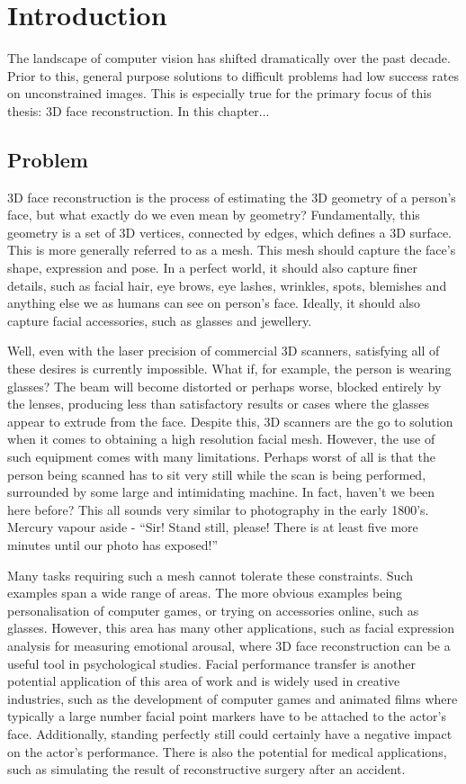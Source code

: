 \graphicspath{{chapter_introduction/}}
\chapter{Introduction}

The landscape of computer vision has shifted dramatically over the
past decade. Prior to this, general purpose solutions to difficult
problems had low success rates on unconstrained images. This is
especially true for the primary focus of this thesis: 3D face
reconstruction. In this chapter...

\section{Problem}

3D face reconstruction is the process of estimating the 3D geometry of
a person's face, but what exactly do we even mean by geometry?
Fundamentally, this geometry is a set of 3D vertices, connected by
edges, which defines a 3D surface. This is more generally referred to
as a mesh. This mesh should capture the face's shape, expression and
pose. In a perfect world, it should also capture finer details, such
as facial hair, eye brows, eye lashes, wrinkles, spots, blemishes and
anything else we as humans can see on person's face. Ideally, it
should also capture facial accessories, such as glasses and jewellery.

Well, even with the laser precision of commercial 3D scanners,
satisfying all of these desires is currently impossible. What if, for
example, the person is wearing glasses? The beam will become distorted
or perhaps worse, blocked entirely by the lenses, producing less than
satisfactory results or cases where the glasses appear to extrude from
the face. Despite this, 3D scanners are the go to solution when it
comes to obtaining a high resolution facial mesh. However, the use of
such equipment comes with many limitations. Perhaps worst of all is
that the person being scanned has to sit very still while the scan is
being performed, surrounded by some large and intimidating machine. In
fact, haven't we been here before? This all sounds very similar to
photography in the early 1800's. Mercury vapour aside - ``Sir! Stand
still, please! There is at least five more minutes until our photo has
exposed!''

Many tasks requiring such a mesh cannot tolerate these
constraints. Such examples span a wide range of areas. The more
obvious examples being personalisation of computer games, or trying on
accessories online, such as glasses. However, this area has many other
applications, such as facial expression analysis for measuring
emotional arousal, where 3D face reconstruction can be a useful tool
in psychological studies. Facial performance transfer is another
potential application of this area of work and is widely used in
creative industries, such as the development of computer games and
animated films where typically a large number facial point markers
have to be attached to the actor's face. Additionally, standing
perfectly still could certainly have a negative impact on the actor's
performance. There is also the potential for medical applications,
such as simulating the result of reconstructive surgery after an
accident.


